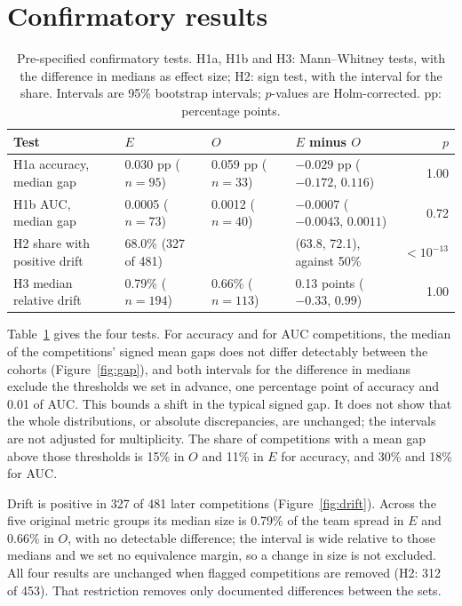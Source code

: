 \documentclass[10pt]{article}
\begin{document}
\section{Confirmatory results}
\label{sec:confirm}

\begin{table}[t]
\caption{Pre-specified confirmatory tests. H1a, H1b and H3: Mann--Whitney tests, with the difference in medians as effect size; H2: sign test, with the interval for the share. Intervals are 95\% bootstrap intervals; $p$-values are Holm-corrected. pp: percentage points.}
\label{tab:confirm}
\centering\small\setlength{\tabcolsep}{4pt}
\begin{tabular}{llllr}
\toprule
Test & $E$ & $O$ & $E$ minus $O$ & $p$ \\
\midrule
H1a accuracy, median gap & 0.030 pp ($n=95$) & 0.059 pp ($n=33$) & $-0.029$ pp ($-0.172$, $0.116$) & 1.00 \\
H1b AUC, median gap & 0.0005 ($n=73$) & 0.0012 ($n=40$) & $-0.0007$ ($-0.0043$, $0.0011$) & 0.72 \\
H2 share with positive drift & 68.0\% (327 of 481) & & (63.8, 72.1), against 50\% & $<10^{-13}$ \\
H3 median relative drift & 0.79\% ($n=194$) & 0.66\% ($n=113$) & 0.13 points ($-0.33$, $0.99$) & 1.00 \\
\bottomrule
\end{tabular}
\end{table}

Table~\ref{tab:confirm} gives the four tests. For accuracy and for AUC competitions, the median of the competitions' signed mean gaps does not differ detectably between the cohorts (Figure~\ref{fig:gap}), and both intervals for the difference in medians exclude the thresholds we set in advance, one percentage point of accuracy and 0.01 of AUC. This bounds a shift in the typical signed gap. It does not show that the whole distributions, or absolute discrepancies, are unchanged; the intervals are not adjusted for multiplicity. The share of competitions with a mean gap above those thresholds is 15\% in $O$ and 11\% in $E$ for accuracy, and 30\% and 18\% for AUC.

Drift is positive in 327 of 481 later competitions (Figure~\ref{fig:drift}). Across the five original metric groups its median size is 0.79\% of the team spread in $E$ and 0.66\% in $O$, with no detectable difference; the interval is wide relative to those medians and we set no equivalence margin, so a change in size is not excluded. All four results are unchanged when flagged competitions are removed (H2: 312 of 453). That restriction removes only documented differences between the sets.
\end{document}

